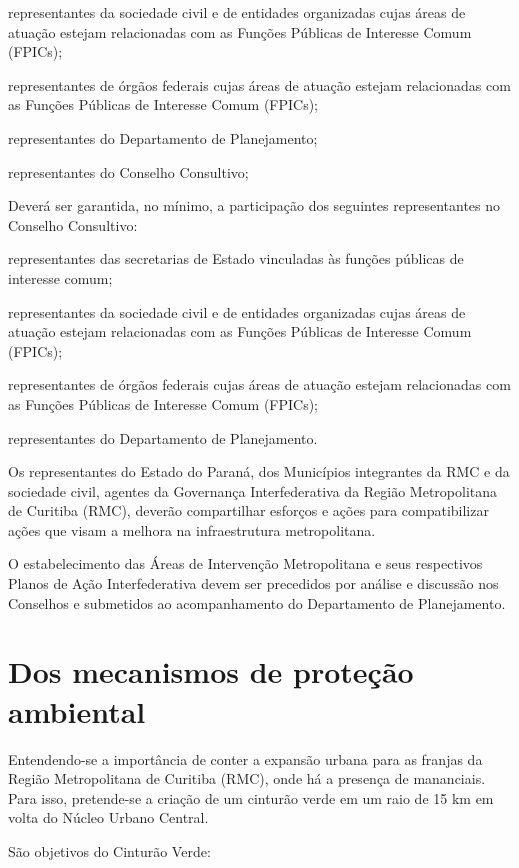 \documentclass[capitulo]{br-lex-2017}
\begin{document}
	\inciso representantes da sociedade civil e de entidades organizadas cujas áreas de atuação estejam relacionadas com as Funções Públicas de Interesse Comum (FPICs);
	
	\inciso representantes de órgãos federais cujas áreas de atuação estejam relacionadas com as Funções Públicas de Interesse Comum (FPICs);
	
	\inciso representantes do Departamento de Planejamento;
	
	\inciso representantes do Conselho Consultivo;

\artigo Deverá ser garantida, no mínimo, a participação dos seguintes representantes no Conselho Consultivo:

	\inciso representantes das secretarias de Estado vinculadas às funções públicas de interesse comum;
	
	\inciso representantes da sociedade civil e de entidades organizadas cujas áreas de atuação estejam relacionadas com as Funções Públicas de Interesse Comum (FPICs);
	
	\inciso representantes de órgãos federais cujas áreas de atuação estejam relacionadas com as Funções Públicas de Interesse Comum (FPICs);
	
	\inciso representantes do Departamento de Planejamento.

\artigo Os representantes do Estado do Paraná, dos Municípios integrantes da RMC e da sociedade civil, agentes da Governança Interfederativa da Região Metropolitana de Curitiba (RMC), deverão compartilhar esforços e ações para compatibilizar ações que visam a melhora na infraestrutura metropolitana.

\artigo O estabelecimento das Áreas de Intervenção Metropolitana e seus respectivos Planos de Ação Interfederativa devem ser precedidos por análise e discussão nos Conselhos e  submetidos ao acompanhamento do Departamento de Planejamento.

\chapter{Dos mecanismos de proteção ambiental}

\artigo Entendendo-se a importância de conter a expansão urbana para as franjas da Região Metropolitana de Curitiba (RMC), onde há a presença de mananciais. Para isso, pretende-se a criação de um cinturão verde em um raio de 15 km em volta do Núcleo Urbano Central.

	\paragrafounico São objetivos do Cinturão Verde:
	
\end{document}

